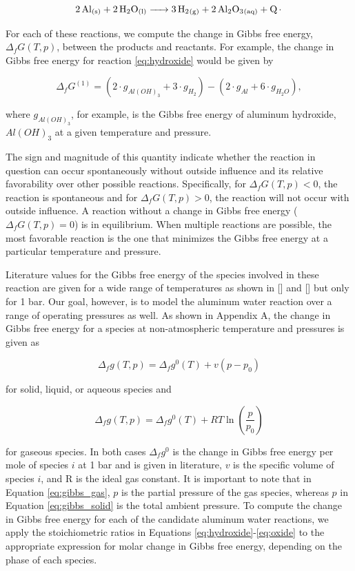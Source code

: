 \documentclass[preprint,12pt,3p]{elsarticle}
\begin{document}
\begin{equation}
  \ce{2Al_{(s)} + 2H2O_{(l)} -> 3H2_{(g)} + 2Al2O3_{(aq)} + Q.}
  \label{eq:oxide}
\end{equation}

For each of these reactions, we compute the change in Gibbs free energy,
$\Delta_fG(T,p)$, between the products and reactants. For example, the change in
Gibbs free energy for reaction \ref{eq:hydroxide} would be given by

\begin{equation}
  \Delta_fG^{(1)} = (2\cdot g_{Al(OH)_3} + 3\cdot g_{H_2}) - (2\cdot g_{Al} + 6\cdot g_{H_2O}),
\end{equation}

\noindent where $g_{Al(OH)_3}$, for example, is the Gibbs free energy of
aluminum hydroxide, $Al(OH)_3$ at a given temperature and pressure.

The sign and magnitude of this quantity indicate whether the reaction in
question can occur spontaneously without outside influence and its relative
favorability over other possible reactions. Specifically, for $\Delta_fG(T,p) <
0$, the reaction is spontaneous and for $\Delta_fG(T,p) > 0$, the reaction will
not occur with outside influence. A reaction without a change in Gibbs free
energy ($\Delta_fG(T,p) = 0$) is in equilibrium. When multiple reactions are
possible, the most favorable reaction is the one that minimizes the Gibbs free
energy at a particular temperature and pressure.

Literature values for the Gibbs free energy of the species involved in these
reaction are given for a wide range of temperatures as shown in [] and [] but
only for 1 bar. Our goal, however, is to model the aluminum water reaction over
a range of operating pressures as well. As shown in Appendix A, the change in
Gibbs free energy for a species at non-atmospheric temperature and pressures is
given as

\begin{equation}
  \Delta_f g(T,p) = \Delta_f g^{0}(T) + v(p-p_0)
  \label{eq:gibbs_solid}
\end{equation}

\noindent for solid, liquid, or aqueous species and

\begin{equation}
  \Delta_f g(T,p) = \Delta_f g^{0}(T) + RT\ln\left(\frac{p}{p_0}\right) 
  \label{eq:gibbs_gas}
\end{equation}

\noindent for gaseous species. In both cases $\Delta_f g^0$ is the change in
Gibbs free energy per mole of species $i$ at 1 bar and is given in literature,
$v$ is the specific volume of species $i$, and R is the ideal gas constant. It
is important to note that in Equation \ref{eq:gibbs_gas}, $p$ is the partial
pressure of the gas species, whereas $p$ in Equation \ref{eq:gibbs_solid} is the
total ambient pressure. To compute the change in Gibbs free energy for each of
the candidate aluminum water reactions, we apply the stoichiometric ratios in
Equations \ref{eq:hydroxide}-\ref{eq:oxide} to the appropriate expression for
molar change in Gibbs free energy, depending on the phase of each species.
\end{document}
